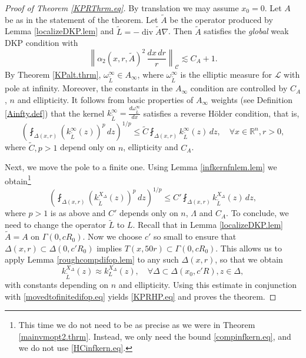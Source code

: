 \documentclass[11pt, a4paper,leqno]{amsart}
\theoremstyle{plain}
\theoremstyle{definition}
\theoremstyle{remark}
\numberwithin{equation}{section}
\newcommand{\rn}{\mathbb{R}^n}
\newcommand{\hm}{\omega}
\def\div{\mathop{\operatorname{div}}\nolimits}
\begin{document}
\begin{proof}[Proof of Theorem \ref{KPRThrm.eq}]\label{KPreprovefull.thrm}
By translation we may assume $x_0 = 0$. Let $A$ be as in the statement of the theorem. Let $\widetilde{A}$ be the operator produced by Lemma \ref{localizeDKP.lem} and $\widetilde{L} = -\div \widetilde{A} \nabla$. Then $\widetilde{A}$ satisfies the {\it global} weak DKP condition with
\[\left\| \alpha_2(x,r, \widetilde{A})^2 \, \frac{dx \, dr}{r} \right\|_{\mathcal{C}} \lesssim C_A + 1.\]
By Theorem \ref{KPalt.thrm},  $\hm^\infty_{\widetilde{L}} \in A_\infty$, where $\hm^\infty_{\widetilde{L}}$ is the elliptic measure for $\mathcal{L}$ with pole at infinity. Moreover, the constants in the $A_\infty$ condition are controlled by $C_A$, $n$ and ellipticity. It follows from basic properties of $A_\infty$ weights (see Definition \ref{Ainfty.def}) that 
the kernel $k^\infty_{\widetilde{L}} = \frac{d\hm^\infty_{\widetilde{L}}}{dx}$ satisfies a reverse H\"older condition, that is,
\[\left(\fint_{\Delta(x,r)} (k^\infty_{\widetilde{L}}(z))^p \, dz \right)^{1/p} \le \widetilde{C} \fint_{\Delta(x,r)} k^\infty_{\widetilde{L}}(z) \, dz, \quad \forall x \in \rn, r > 0,\]
where $\widetilde{C}, p > 1$ depend only on $n$, ellipticity and $C_A$. 

Next, we move the pole to a finite one. Using Lemma \ref{infkernfnlem.lem} we obtain\footnote{This time we do not need to be as precise as we were in Theorem \ref{mainvmopt2.thrm}. Instead, we only need the bound \eqref{compinfkern.eq}, and we do not use \eqref{HCinfkern.eq}.}
\begin{equation}\label{movedtofinitedifop.eq}
\left(\fint_{\Delta(x,r)} (k^{X_\Delta}_{\widetilde{L}}(z))^p \, dz \right)^{1/p} \le C' \fint_{\Delta(x,r)} k^{X_\Delta}_{\widetilde{L}}(z) \, dz,
\end{equation}
where $p >1$ is as above and $C'$ depends only on $n$, $\Lambda$ and $C_A$. To conclude, we need to change the operator $\widetilde{L}$ to $L$. Recall that in Lemma \ref{localizeDKP.lem} $\widetilde{A} = A$ on $\Gamma(0, cR_0)$. Now we choose $c'$ so small to ensure that $\Delta(x,r) \subset \Delta(0, c' R_0)$ implies $T(x,50r) \subset \Gamma(0, cR_0)$. This allows us to apply Lemma \ref{roughcompdifop.lem} to any such $\Delta(x,r)$, so that we obtain
\[k^{X_\Delta}_{\widetilde{L}}(z) \approx k^{X_\Delta}_{L}(z), \quad \forall \Delta \subset \Delta(x_0, c'R), z \in \Delta,\]
with constants depending on $n$ and ellipticity.
Using this estimate in conjunction with \eqref{movedtofinitedifop.eq} yields \eqref{KPRHP.eq} and proves the theorem.
\end{proof}
\end{document}
